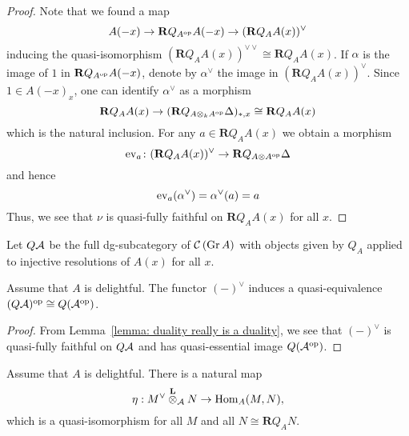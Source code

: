 \begin{proof}
  Note that we found a map
  \begin{displaymath}
    A(-x) \to \mathbf{R}Q_{A^{\operatorname{op}}} A(-x) \to ( \mathbf{R}Q_A A(x) )^\vee 
  \end{displaymath}
  inducing the quasi-isomorphism \((\mathbf{R}Q_A A(x))^{\vee \vee} \cong \mathbf{R}Q_A A(x)\).
  If \(\alpha\) is the image of \(1\) in \(\mathbf{R}Q_{A^{\operatorname{op}}} A(-x)\), denote by \(\alpha^\vee\) the image in \((\mathbf{R}Q_A A(x))^\vee\).
  Since \(1 \in A(-x)_x\), one can identify \(\alpha^\vee\) as a morphism
  \[\mathbf{R}Q_A A(x) \to (\mathbf{R}Q_{A \otimes_k A^{\operatorname{op}}} \Delta)_{\ast,x} \cong \mathbf{R}Q_A A(x)\]
  which is the natural inclusion.
  For any \(a \in \mathbf{R}Q_A A(x)\) we obtain a morphism
  \[\operatorname{ev}_a \colon (\mathbf{R}Q_A A(x))^\vee \to \mathbf{R}Q_{A \otimes A^{\operatorname{op}}} \Delta \]
  and hence
  \[\operatorname{ev}_a(\alpha^\vee) = \alpha^\vee(a) = a\]
  Thus, we see that \(\nu\) is quasi-fully faithful on \(\mathbf{R}Q_A A(x)\) for all \(x\). 
\end{proof}

\begin{definition}
  Let \(Q\mathcal{A}\) be the full dg-subcategory of \(\mathcal{C}\left(\operatorname{Gr}A\right)\) with objects given by \(Q_A\) applied to injective resolutions of \(A(x)\) for all \(x\). 
\end{definition}

\begin{corollary} \label{corollary: duality is a duality}
  Assume that \(A\) is delightful. The functor \((-)^\vee\) induces a quasi-equivalence \((Q\mathcal{A})^{\operatorname{op}} \cong Q(\mathcal{A}^{\operatorname{op}})\). 
\end{corollary}

\begin{proof}
  From Lemma~\ref{lemma: duality really is a duality}, we see that \((-)^\vee\) is quasi-fully faithful on \(Q\mathcal{A}\) and has quasi-essential image \(Q(\mathcal{A}^{\operatorname{op}})\). 
\end{proof}

\begin{lemma} \label{lemma: trace map}
  Assume that \(A\) is delightful. There is a natural map 
  \begin{displaymath}
    \eta : M^\vee \overset{\mathbf{L}}{\otimes}_{\mathcal A} N \to \operatorname{Hom}_A(M,N),
  \end{displaymath}
  which is a quasi-isomorphism for all \(M\) and all \(N \cong \mathbf{R}Q_A N\).
  
\end{lemma}

